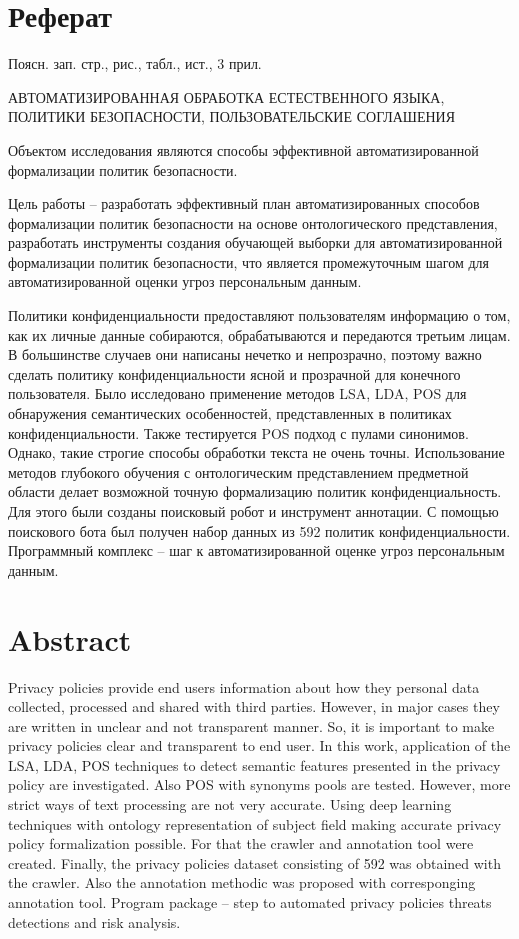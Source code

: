 \documentclass[../main]{subfiles}
\begin{document}
\newpage
{}
\section*{Реферат}
Поясн. зап.  стр.,   рис.,  табл.,  ист., 3 прил.

{   
    \jj\parindent=12.5mm
    \par
    \MakeUppercase{автоматизированная обработка естественного языка, политики безопасности, пользовательские соглашения}
    \par
}

Объектом  исследования являются способы эффективной автоматизированной формализации политик безопасности.

Цель работы -- разработать эффективный план автоматизированных способов формализации политик безопасности на основе онтологического представления, разработать инструменты создания обучающей выборки для автоматизированной формализации политик безопасности, что является промежуточным шагом для автоматизированной оценки угроз персональным данным.

Политики конфиденциальности предоставляют пользователям информацию о том, как их личные данные собираются, обрабатываются и передаются третьим лицам. В большинстве случаев они написаны нечетко и непрозрачно, поэтому важно сделать политику конфиденциальности ясной и прозрачной для конечного пользователя. Было исследовано применение методов LSA, LDA, POS для обнаружения семантических особенностей, представленных в политиках конфиденциальности. Также тестируется POS подход с пулами синонимов. Однако, такие строгие способы обработки текста не очень точны. Использование методов глубокого обучения с онтологическим представлением предметной области делает возможной точную формализацию политик конфиденциальность. Для этого были созданы поисковый робот и инструмент аннотации. С помощью поискового бота был получен набор данных из 592 политик конфиденциальности. Программный комплекс -- шаг к автоматизированной оценке угроз персональным данным.

\newpage
\section*{Abstract}
Privacy policies provide end users information about how they personal data collected, processed and shared with third parties. However, in major cases they are written in unclear and not transparent manner. So, it is important to make privacy  policies clear and transparent to end user. In this work, application of the LSA, LDA, POS techniques to detect semantic features presented in the privacy policy are investigated. Also POS with synonyms pools are tested. However, more strict ways of text processing are not very accurate. Using deep learning techniques with ontology representation of subject field making accurate privacy policy formalization possible. For that the crawler and annotation tool were created. Finally, the privacy policies dataset consisting of 592 was obtained with the crawler. Also the annotation methodic was proposed with corresponging annotation tool. Program package -- step to automated privacy policies threats detections and risk analysis.
\end{document}
